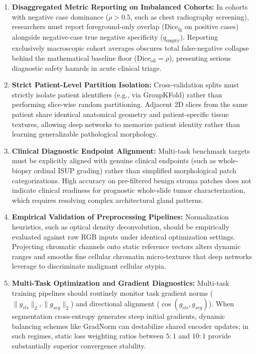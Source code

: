 \documentclass[conference,a4paper]{IEEEtran}
\begin{document}
\begin{enumerate}
    \item \textbf{Disaggregated Metric Reporting on Imbalanced Cohorts:} In cohorts with negative case dominance ($\rho > 0.5$, such as chest radiography screening), researchers must report foreground-only overlap ($\text{Dice}_{\text{fg}}$ on positive cases) alongside negative-case true negative specificity ($q_{\text{empty}}$). Reporting exclusively macroscopic cohort averages obscures total false-negative collapse behind the mathematical baseline floor ($\overline{\text{Dice}}_{\text{all}} = \rho$), presenting serious diagnostic safety hazards in acute clinical triage.
    \item \textbf{Strict Patient-Level Partition Isolation:} Cross-validation splits must strictly isolate patient identifiers (e.g., via GroupKFold) rather than performing slice-wise random partitioning. Adjacent 2D slices from the same patient share identical anatomical geometry and patient-specific tissue textures, allowing deep networks to memorize patient identity rather than learning generalizable pathological morphology.
    \item \textbf{Clinical Diagnostic Endpoint Alignment:} Multi-task benchmark targets must be explicitly aligned with genuine clinical endpoints (such as whole-biopsy ordinal ISUP grading) rather than simplified morphological patch categorizations. High accuracy on pre-filtered benign stroma patches does not indicate clinical readiness for prognostic whole-slide tumor characterization, which requires resolving complex architectural gland patterns.
    \item \textbf{Empirical Validation of Preprocessing Pipelines:} Normalization heuristics, such as optical density deconvolution, should be empirically evaluated against raw RGB inputs under identical optimization settings. Projecting chromatic channels onto static reference vectors alters dynamic ranges and smooths fine cellular chromatin micro-textures that deep networks leverage to discriminate malignant cellular atypia.
    \item \textbf{Multi-Task Optimization and Gradient Diagnostics:} Multi-task training pipelines should routinely monitor task gradient norms ($\|g_{cls}\|_2, \|g_{seg}\|_2$) and directional alignment ($\cos(g_{cls}, g_{seg})$). When segmentation cross-entropy generates steep initial gradients, dynamic balancing schemes like GradNorm can destabilize shared encoder updates; in such regimes, static loss weighting ratios between $5{:}1$ and $10{:}1$ provide substantially superior convergence stability.
\end{enumerate}
\end{document}
